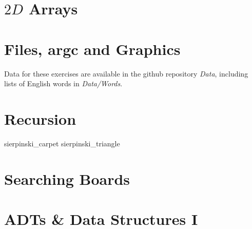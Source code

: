 \chapter{$2D$ Arrays}

\nopartorder










\chapter{Files, argc and Graphics}

Data for these exercises are available in the github repository {\em
Data}, including lists of English words in {\em Data/Words}.








\setcounter{chapter}{6}
\chapter{Recursion}






 {sierpinski_carpet}
 {sierpinski_triangle}

%

\chapter{Searching Boards}










\chapter{ADTs \& Data Structures I}

